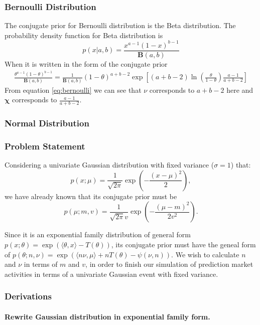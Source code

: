\documentclass[12pt]{article}
\begin{document}
\subsubsection{Bernoulli Distribution}
The conjugate prior for Bernoulli distribution is the Beta distribution. The probability density function for Beta distribution is
\begin{equation}\label{eq:beta}
    p(x| a,b)=\frac{x^{a-1}(1-x)^{b-1}}{\mathbf{B}(a, b)}
\end{equation}
When it is written in the form of the conjugate prior
\begin{equation}\label{eq:bernoulli}
    \begin{split}
        \frac{\theta^{a-1}(1-\theta)^{b-1}}{\mathbf{B}(a, b)}
        =\frac{1}{\mathbf{B}(a, b)}(1-\theta)^{a+b-2}\exp\left[ (a+b-2)\ln\left( \frac{\theta}{1-\theta} \right)\frac{a-1}{a+b-2} \right]
    \end{split}
\end{equation}
From equation \ref{eq:bernoulli} we can see that $\nu$ corresponds to $a+b-2$ here and $\bm{\chi}$ corresponds to $\frac{a-1}{a+b-2}$.
\subsubsection{Normal Distribution}
\subsubsection*{Problem Statement}
Considering a univariate Gaussian distribution with fixed variance ($\sigma=1$) that:
\[ p(x;\mu)=\frac{1}{\sqrt{2\pi}}\exp\left( -\frac{(x-\mu)^2}{2} \right), \]
we have already known that its conjugate prior must be \[p(\mu;m,v)=\frac{1}{\sqrt{2\pi}v}\exp\left( -\frac{(\mu-m)^2}{2v^2} \right).\]

Since it is an exponential family distribution of general form $p(x;\theta)=\exp\left( \langle\theta,x\rangle-T(\theta) \right)$, its conjugate prior must have the geneal form of $p(\theta;n,\nu)=\exp\left( \langle n\nu,\mu\rangle+nT(\theta)-\psi(\nu,n) \right).$ We wish to calculate $n$ and $\nu$ in terms of $m$ and $v$, in order to finish our simulation of prediction market activities in terms of a univariate Gaussian event with fixed variance.

\subsubsection*{Derivations}
\paragraph{Rewrite Gaussian distribution in exponential family form.}~
\end{document}
